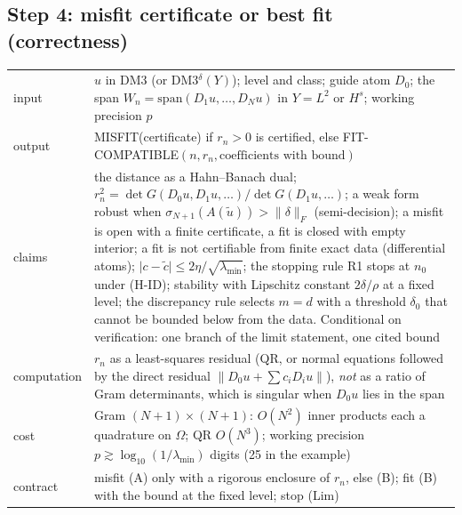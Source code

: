 \documentclass[11pt]{article}
\theoremstyle{plain}
\theoremstyle{definition}
\theoremstyle{remark}
\newcommand{\lab}[1]{\textsf{#1}}           %
\newcommand{\FC}{\lab{FIT-COMPATIBLE}}
\newcommand{\MIS}{\lab{MISFIT}}
\begin{document}
\subsection*{Step 4: misfit certificate or best fit (correctness)}
\begin{tabular}{@{}p{2.2cm}p{9.6cm}@{}}
\toprule
input & $u$ in DM3 (or DM3$^\delta(Y)$); level and class; guide atom $D_0$; the span $W_n=\mathrm{span}(D_1u,\dots,D_Nu)$ in $Y=L^2$ or $H^s$; working precision $p$\\
output & \MIS{}(certificate) if $r_n>0$ is certified, else \FC{}$(n,r_n,\text{coefficients with bound})$\\
claims & the distance as a Hahn--Banach dual; $r_n^2=\det G(D_0u,D_1u,\dots)/\det G(D_1u,\dots)$; a weak form robust when $\sigma_{N+1}(A(\tilde u))>\lVert\delta\rVert_F$ (semi-decision); a misfit is open with a finite certificate, a fit is closed with empty interior; a fit is not certifiable from finite exact data (differential atoms); $\lvert c-\tilde c\rvert\le2\eta/\sqrt{\lambda_{\min}}$; the stopping rule R1 stops at $n_0$ under (H-ID); stability with Lipschitz constant $2\delta/\rho$ at a fixed level; the discrepancy rule selects $m=d$ with a threshold $\delta_0$ that cannot be bounded below from the data. Conditional on verification: one branch of the limit statement, one cited bound\\
computation & $r_n$ as a least-squares residual (QR, or normal equations followed by the direct residual $\lVert D_0u+\sum c_iD_iu\rVert$), \emph{not} as a ratio of Gram determinants, which is singular when $D_0u$ lies in the span\\
cost & Gram $(N+1)\times(N+1)$: $O(N^2)$ inner products each a quadrature on $\Omega$; QR $O(N^3)$; working precision $p\gtrsim\log_{10}(1/\lambda_{\min})$ digits (25 in the example)\\
contract & misfit (A) only with a rigorous enclosure of $r_n$, else (B); fit (B) with the bound at the fixed level; stop (Lim)\\
\bottomrule
\end{tabular}
\end{document}

